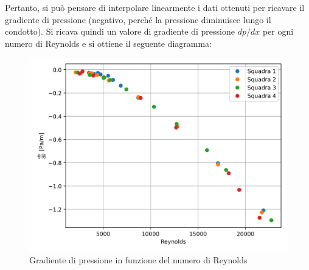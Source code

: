\noindent Pertanto, si può pensare di interpolare linearmente i dati ottenuti per ricavare il gradiente di pressione (negativo, perché la pressione diminuisce lungo il condotto). Si ricava quindi un valore di gradiente di pressione $dp/dx$ per ogni numero di Reynolds e si ottiene il seguente diagramma:
\begin{figure}[H]
    \centering
    \includegraphics[width=.7\textwidth]{images/7/dpdx.png}
    \caption{Gradiente di pressione in funzione del numero di Reynolds}
\end{figure}

